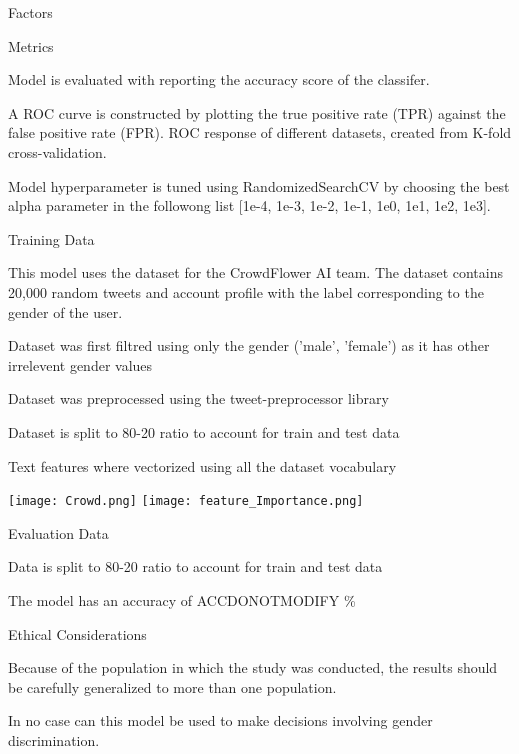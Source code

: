 \documentclass{article}
\begin{document}
\begin{adjustwidth}{-60pt}{-30pt}
\begin{singlespace}
\begin{tcolorbox}[title=\textbf{Model Card - Tweeter Gender Classification },
     breakable, sharp corners, boxrule=0.7pt]
{\begin{mcsection}{Factors}
 \end{mcsection}
 
 \begin{mcsection}{Metrics}
     \item Model is evaluated with reporting the accuracy score of the classifer.
     
     \item A ROC curve is constructed by plotting the true positive rate (TPR) against the false positive rate (FPR). ROC response of different datasets, created from K-fold cross-validation.
     
     \item Model hyperparameter is tuned using RandomizedSearchCV by choosing the best alpha parameter in the followong list [1e-4, 1e-3, 1e-2, 1e-1, 1e0, 1e1, 1e2, 1e3].
     
 \end{mcsection}
 
 \begin{mcsection}{Training Data}
     \item This model uses the dataset for the CrowdFlower AI team.  The dataset contains 20,000 random tweets and account profile with the label corresponding to the gender of the user.
     \item Dataset was first filtred using only the gender ('male', 'female') as it has other irrelevent gender values
     \item Dataset was preprocessed using the tweet-preprocessor library 
     \item Dataset is split to 80-20 ratio to account for train and test data
     \item Text features where vectorized using all the dataset vocabulary 

 \end{mcsection}
     \texttt{[image: Crowd.png]}
    \texttt{[image: feature\_Importance.png]}
 
 \begin{mcsection}{Evaluation Data}
   
     \item Data is split to 80-20 ratio to account for train and test data
     \item The model has an accuracy of ACCDONOTMODIFY \%
  

 \end{mcsection}
 
 
 \begin{mcsection}{Ethical Considerations}
     \item Because of the population in which the study was conducted, the results should be carefully generalized to more than one population.
     \item In no case can this model be used to make decisions involving gender discrimination.
 \end{mcsection}
 
}
\end{tcolorbox}
\end{singlespace}
\end{adjustwidth}
\end{document}
